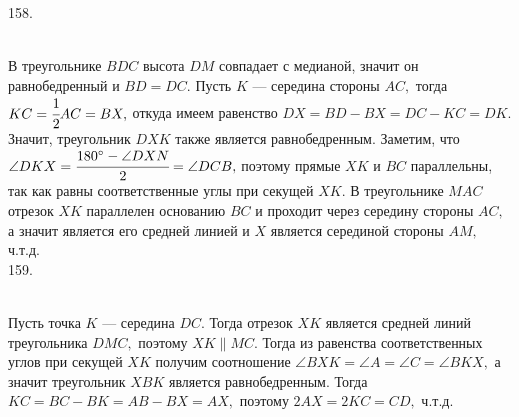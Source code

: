 158. \begin{figure}[ht!]
\end{figure}\\
В треугольнике $BDC$ высота $DM$ совпадает с медианой, значит он равнобедренный и $BD=DC.$ Пусть $K$ --- середина стороны $AC,$ тогда $KC=\cfrac{1}{2} AC=BX,$ откуда имеем равенство $DX=BD-BX=DC-KC=DK.$ Значит, треугольник $DXK$ также является равнобедренным. Заметим, что $\angle DKX=\cfrac{180^\circ-\angle DXN}{2}=\angle DCB,$ поэтому прямые $XK$ и $BC$ параллельны, так как равны соответственные углы при секущей $XK.$ В треугольнике $MAC$ отрезок $XK$ параллелен основанию $BC$ и проходит через середину стороны $AC,$ а значит является его средней линией и $X$ является серединой стороны $AM,$ ч.т.д.\\
159. \begin{figure}[ht!]
\end{figure}\\
Пусть точка $K$ --- середина $DC.$ Тогда отрезок $XK$ является средней линий треугольника $DMC,$ поэтому $XK\parallel MC.$ Тогда из равенства соответственных углов при секущей $XK$ получим соотношение $\angle BXK=\angle A=\angle C=\angle BKX,$ а значит треугольник $XBK$ является равнобедренным. Тогда $KC=BC-BK=AB-BX=AX,$ поэтому $2AX=2KC=CD,$ ч.т.д.

